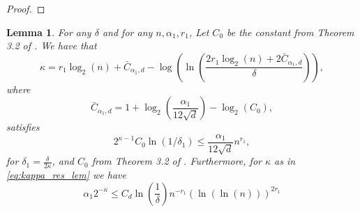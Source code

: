 \documentclass[12pt]{article}
\newtheorem{Lemma}[Theorem]{Lemma}
\theoremstyle{remark}
\begin{document}
\begin{appendices}
\begin{proof}
\end{proof}
\begin{Lemma}\label{lem:comute_kappa}
For any $\delta$ and for any $n,\alpha_1,r_1$, Let $C_{0}$ be the constant from Theorem 3.2 of \cite{aizenbud2021VectorEstimation}. We have that 
    \begin{equation}\label{eq:kappa_res_lem}
        \kappa = r_1\log_2(n) + \bar{C}_{\alpha_1,d} - \log\left(\ln\left(\frac{2r_1\log_2(n) + 2\bar{C}_{ \alpha_1,d}}{\delta}\right)\right)
    ,\end{equation}
    where
  \[
    \bar{C}_{ \alpha_1,d} = 1 + \log_2\left(\frac{ \alpha_1}{12\sqrt{d}}\right) -\log_2(C_0 )
    ,
    \]
    satisfies 
    \begin{equation}\label{eq:n_bound1_kappa_lem}
        2^{\kappa-1}C_0 \ln(1/\delta_1) \leq \frac{ \alpha_1}{12\sqrt{d}}n^{r_1},
    \end{equation}
    for $\delta_1 = \frac{\delta}{2\kappa}$, and $C_0$ from Theorem 3.2 of \cite{aizenbud2021VectorEstimation}.
    Furthermore, for $\kappa$ as in \eqref{eq:kappa_res_lem} we have 
    \[
     \alpha_1 2^{-\kappa} \leq C_{d} \ln\left(\frac{1}{\delta}\right) n^{-r_1}\left(\ln\left(\ln(n) \right)\right)^{2r_1}
    \]
\end{Lemma}


\end{appendices}
\end{document}
